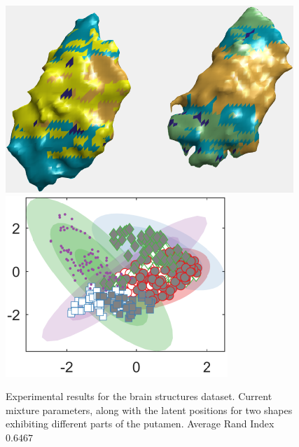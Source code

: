 \documentclass[]{article}
\newcommand{\gD}[2]{\mathcal{N}\left(#1,#2\right)}
\newcommand{\eye}{\mathbf{I}}
\newcommand{\setWv}{\mathbf{W}^{v}}
\newcommand{\setYv}{\mathbf{Y}^{v}}
\newcommand{\setXv}{\mathbf{X}^{v}}
\newcommand{\setZv}{\mathbf{Z}^{v}}
\newcommand{\setFv}{\mathbf{F}^{v}}
\newcommand{\hParams}{\boldsymbol{\theta}}
\begin{document}
\begin{figure}[ht!]
	\centering
	
	\includegraphics[width=0.45\linewidth]{img/putamen1MVMMexp1}
	\includegraphics[width=0.35\linewidth]{img/putamen1MVMMexp3}
	\caption{Experimental results for the brain structures dataset.  Current mixture parameters, along with the latent positions for two shapes exhibiting different parts of the putamen. Average Rand Index $0.6467$ }
\end{figure}


%
%
%
%
%
%
%




\end{document}
